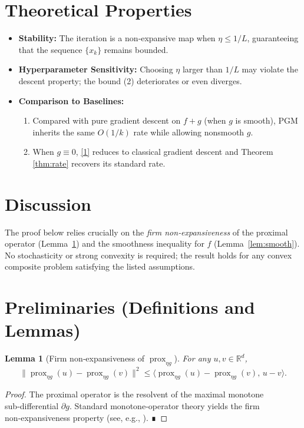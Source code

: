 \documentclass{article}
\newtheorem{lemma}{Lemma}
\newcommand{\prox}{\operatorname{prox}}
\newcommand{\R}{\mathbb{R}}
\begin{document}
\section*{Theoretical Properties}
\begin{itemize}[noitemsep]
\item \textbf{Stability:} The iteration is a non‑expansive map when $\eta\le 1/L$, guaranteeing that the sequence $\{x_{k}\}$ remains bounded.
\item \textbf{Hyperparameter Sensitivity:} Choosing $\eta$ larger than $1/L$ may violate the descent property; the bound (2) deteriorates or even diverges.
\item \textbf{Comparison to Baselines:}
    \begin{enumerate}
    \item Compared with pure gradient descent on $f+g$ (when $g$ is smooth), PGM inherits the same $O(1/k)$ rate while allowing nonsmooth $g$.
    \item When $g\equiv0$, \eqref{1} reduces to classical gradient descent and Theorem \ref{thm:rate} recovers its standard rate.
    \end{enumerate}
\end{itemize}

\section*{Discussion}
The proof below relies crucially on the \emph{firm non‑expansiveness} of the proximal operator (Lemma~\ref{lem:firm}) and the smoothness inequality for $f$ (Lemma~\ref{lem:smooth}). No stochasticity or strong convexity is required; the result holds for any convex composite problem satisfying the listed assumptions.

\newpage
\section*{Preliminaries (Definitions and Lemmas)}
\begin{lemma}[Firm non‑expansiveness of $\prox_{\eta g}$]\label{lem:firm}
For any $u,v\in\R^{d}$,
\[
\bigl\|\prox_{\eta g}(u)-\prox_{\eta g}(v)\bigr\|^{2}
\le \bigl\langle \prox_{\eta g}(u)-\prox_{\eta g}(v),\,u-v\bigr\rangle .
\tag{3}
\]
\end{lemma}
\begin{proof}
The proximal operator is the resolvent of the maximal monotone sub‑differential $\partial g$.  
Standard monotone‑operator theory yields the firm non‑expansiveness property (see, e.g., \cite{rockafellar1976}). ∎
\end{proof}
\end{document}
